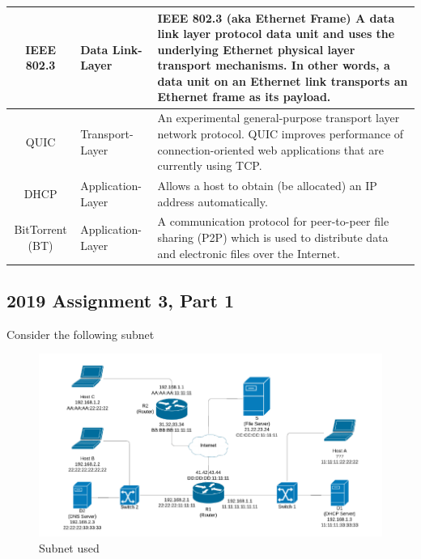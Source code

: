 \documentclass{article}
\begin{document}
\begin{center}
\begin{longtable}{| c | m{8em} | m{30em} |}
 \hline
IEEE 802.3 & Data Link-Layer & 
IEEE 802.3 (aka Ethernet Frame) A data link layer protocol data unit and uses the underlying Ethernet physical layer transport mechanisms. In other words, a data unit on an Ethernet link transports an Ethernet frame as its payload. \\
 \hline
QUIC & Transport-Layer & 
An experimental general-purpose transport layer network protocol. QUIC improves performance of connection-oriented web applications that are currently using TCP. \\
 \hline
DHCP & Application-Layer & 
Allows a host to obtain (be allocated) an IP address automatically. \\
 \hline
BitTorrent (BT) & Application-Layer & 
A communication protocol for peer-to-peer file sharing (P2P) which is used to distribute data and electronic files over the Internet. \\
 \hline
\end{longtable}
\end{center}

\subsection*{2019 Assignment 3, Part 1}

Consider the following subnet
\begin{figure}[H]
    \centering
    \includegraphics[scale=0.6]{images/arp_3.png}
    \caption{Subnet used}
\end{figure}
\end{document}
